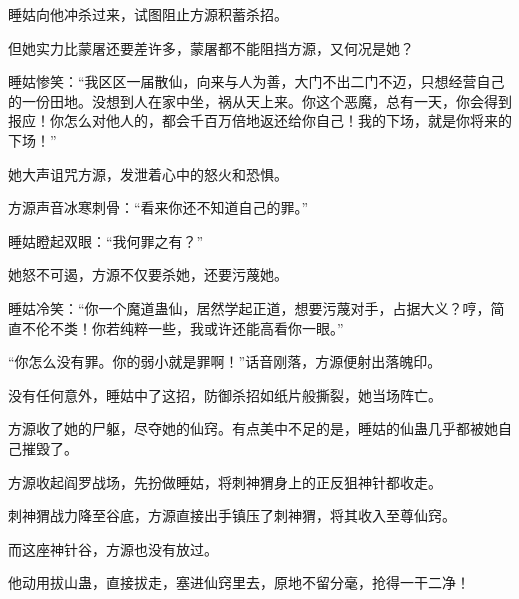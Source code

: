 \begin{this_body}
睡姑向他冲杀过来，试图阻止方源积蓄杀招。

但她实力比蒙屠还要差许多，蒙屠都不能阻挡方源，又何况是她？

睡姑惨笑：“我区区一届散仙，向来与人为善，大门不出二门不迈，只想经营自己的一份田地。没想到人在家中坐，祸从天上来。你这个恶魔，总有一天，你会得到报应！你怎么对他人的，都会千百万倍地返还给你自己！我的下场，就是你将来的下场！”

她大声诅咒方源，发泄着心中的怒火和恐惧。

方源声音冰寒刺骨：“看来你还不知道自己的罪。”

睡姑瞪起双眼：“我何罪之有？”

她怒不可遏，方源不仅要杀她，还要污蔑她。

睡姑冷笑：“你一个魔道蛊仙，居然学起正道，想要污蔑对手，占据大义？哼，简直不伦不类！你若纯粹一些，我或许还能高看你一眼。”

“你怎么没有罪。你的弱小就是罪啊！”话音刚落，方源便射出落魄印。

没有任何意外，睡姑中了这招，防御杀招如纸片般撕裂，她当场阵亡。

方源收了她的尸躯，尽夺她的仙窍。有点美中不足的是，睡姑的仙蛊几乎都被她自己摧毁了。

方源收起阎罗战场，先扮做睡姑，将刺神猬身上的正反狙神针都收走。

刺神猬战力降至谷底，方源直接出手镇压了刺神猬，将其收入至尊仙窍。

而这座神针谷，方源也没有放过。

他动用拔山蛊，直接拔走，塞进仙窍里去，原地不留分毫，抢得一干二净！

\end{this_body}

